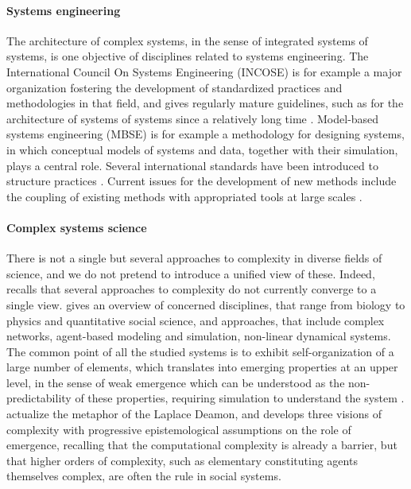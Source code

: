 \documentclass[alpha-refs]{wiley-article}
\begin{document}
\paragraph{Systems engineering}

The architecture of complex systems, in the sense of integrated systems of systems, is one objective of disciplines related to systems engineering. The International Council On Systems Engineering (INCOSE) is for example a major organization fostering the development of standardized practices and methodologies in that field, and gives regularly mature guidelines, such as for the architecture of systems of systems since a relatively long time \cite{maier1998architecting}. Model-based systems engineering (MBSE) \cite{estefan2007survey} is for example a methodology for designing systems, in which conceptual models of systems and data, together with their simulation, plays a central role. Several international standards have been introduced to structure practices \cite{schneider2013literature}. Current issues for the development of new methods include the coupling of existing methods with appropriated tools at large scales \cite{schafer2017challenges}.


\paragraph{Complex systems science}

There is not a single but several approaches to complexity in diverse fields of science, and we do not pretend to introduce a unified view of these. Indeed, \cite{chu2008criteria} recalls that several approaches to complexity do not currently converge to a single view. \cite{newman2011complex} gives an overview of concerned disciplines, that range from biology to physics and quantitative social science, and approaches, that include complex networks, agent-based modeling and simulation, non-linear dynamical systems. The common point of all the studied systems is to exhibit self-organization of a large number of elements, which translates into emerging properties at an upper level, in the sense of weak emergence which can be understood as the non-predictability of these properties, requiring simulation to understand the system \cite{bedau2002downward}. \cite{deffuant2015visions} actualize the metaphor of the Laplace Deamon, and develops three visions of complexity with progressive epistemological assumptions on the role of emergence, recalling that the computational complexity is already a barrier, but that higher orders of complexity, such as elementary constituting agents themselves complex, are often the rule in social systems.
\end{document}
